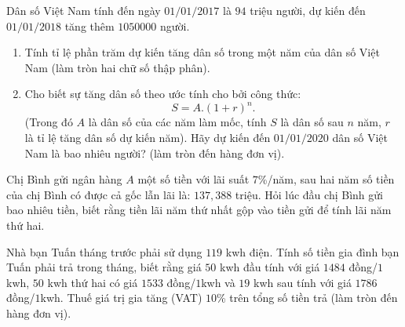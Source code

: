 \begin{bt}%
Dân số Việt Nam tính đến ngày $01/01/2017$ là $94$ triệu người, dự kiến đến $01/01/2018$ tăng thêm $1050000$ người.
\begin{enumerate}
	\item Tính tỉ lệ phần trăm dự kiến tăng dân số trong một năm của dân số Việt Nam (làm tròn hai chữ số thập phân).
	\item Cho biết sự tăng dân số theo ước tính cho bởi công thức: 
	\[S = A.(1+r)^n.\]
	(Trong đó $A$ là dân số của các năm làm mốc, tính $S$ là dân số sau $n$ năm, $r$ là tỉ lệ tăng dân số dự kiến năm). Hãy dự kiến đến $01/01/2020$ dân số Việt Nam là bao nhiêu người? (làm tròn đến hàng đơn vị).	
\end{enumerate}
\end{bt}

\begin{bt}%
	Chị Bình gửi ngân hàng $A$ một số tiền với lãi suất $7$\%/năm, sau hai năm số tiền của chị Bình có được cả gốc lẫn lãi là: $137{,}388$ triệu. Hỏi lúc đầu chị Bình gửi bao nhiêu tiền, biết rằng tiền lãi năm thứ nhất gộp vào tiền gửi để tính lãi năm thứ hai. 
\end{bt}

\begin{bt}%
	Nhà bạn Tuấn tháng trước phải sử dụng $119$ kwh điện. Tính số tiền gia đình bạn Tuấn phải trả trong tháng, biết rằng giá $50$ kwh đầu tính với giá $1484$ đồng/$1$kwh, $50$ kwh thứ hai có giá $1533$ đồng/$1$kwh và $19$ kwh sau tính với giá $1786$ đồng/$1$kwh. Thuế giá trị gia tăng (VAT) $10$\% trên tổng số tiền trả (làm tròn đến hàng đơn vị). 
\end{bt}

